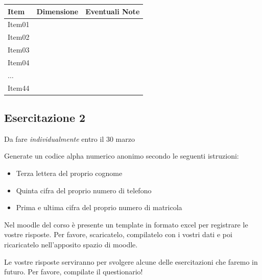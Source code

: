 \documentclass[compress]{beamer}
\begin{document}
\begin{frame}
	\centering
	\begin{tabular}{l c c}
		\hline
		Item & Dimensione & Eventuali Note \\
		\hline
		Item01 & & \\
		 Item02& & \\
		 Item03& & \\
		 Item04& & \\
		 $\ldots$& & \\
		 Item44 & & \\
		\hline
	\end{tabular}
\end{frame}

\subsection*{Esercitazione 2}

\begin{frame}
	Da fare \emph{individualmente} entro il 30 marzo 
	
	Generate un codice alpha numerico anonimo secondo le seguenti istruzioni: 
	
	\begin{itemize}
		\item Terza lettera del proprio cognome
		\item Quinta cifra del proprio numero di telefono
		\item Prima e ultima cifra del proprio numero di matricola
	\end{itemize}
	
	Nel moodle del corso è presente un template in formato excel per registrare le vostre risposte. Per favore, scaricatelo, compilatelo con i vostri dati e poi ricaricatelo nell'apposito spazio di moodle. 
	
	Le vostre risposte serviranno per svolgere alcune delle esercitazioni che faremo in futuro. Per favore, compilate il questionario!
\end{frame}
\end{document}
